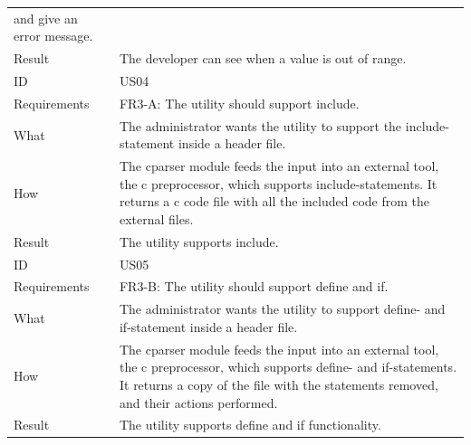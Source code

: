 \begin{table}[htbp]
{\begin{tabularx}{1.2\textwidth}{l X}
	and give an error message. \\
	Result & The developer can see when a value is out of range. \\
	\midrule
	ID & US04 \\
	Requirements & FR3-A: The \gls{utility} should support \gls{include}.\\
	What & The administrator wants the \gls{utility} to support the \gls{include}-statement inside a \gls{header} file.\\
	How & The cparser module feeds the input into an external tool, the \Gls{c} \gls{preprocessor}, which supports 
		\gls{include}-statements. It returns a \Gls{c} code file with all the included code from the external files. \\
	Result & The \gls{utility} supports \gls{include}. \\
	\midrule
	ID & US05 \\
	Requirements & FR3-B: The \gls{utility} should support \gls{define} and \gls{if}. \\
	What & The administrator wants the \gls{utility} to support \gls{define}- and \gls{if}-statement inside a \gls{header} file.\\
	How & The cparser module feeds the input into an external tool, the \Gls{c} \gls{preprocessor}, which supports 
		\gls{define}- and \gls{if}-statements. It returns a copy of the file with the statements removed, and their actions performed. \\
	Result & The \gls{utility} supports \gls{define} and \gls{if} functionality. \\
	\bottomrule
\end{tabularx}}
\end{table}

